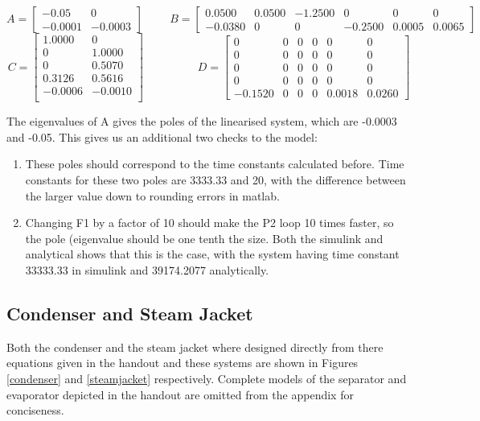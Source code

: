 \documentclass[11pt]{article}
\begin{document}
\[
A = 
\begin{bmatrix}
-0.05 & 0 \\
-0.0001 & -0.0003
\end{bmatrix}
\hspace{1cm}
B = 
\begin{bmatrix}
0.0500 & 0.0500 & -1.2500 & 0 & 0 & 0\\
-0.0380 & 0 & 0 & -0.2500 & 0.0005 & 0.0065
\end{bmatrix}
\]
\[
C = 
\begin{bmatrix}
    1.0000&         0\\
         0&    1.0000\\
         0&    0.5070\\
    0.3126&    0.5616\\
   -0.0006&   -0.0010\\

\end{bmatrix}
\hspace{2cm}
D = 
\begin{bmatrix}
0&         0&         0&         0&         0&         0\\
0&         0&         0&         0&         0&         0\\
0&         0&         0&         0&         0&         0\\
0&         0&         0&         0&         0&         0\\
-0.1520 &        0&         0&         0&    0.0018&    0.0260

\end{bmatrix}
\]

The eigenvalues of A gives the poles of the linearised system, which are -0.0003 and -0.05. This gives us an additional two checks to the model: 
\begin{enumerate}
\item These poles should correspond to the time constants calculated before. Time constants for these two poles are 3333.33 and 20, with the difference between the larger value down to rounding errors in matlab.
\item Changing F1 by a factor of 10 should make the P2 loop 10 times faster, so the pole (eigenvalue should be one tenth the size. Both the simulink and analytical shows that this is the case, with the system having time constant 33333.33 in simulink and 39174.2077 analytically.
\end{enumerate}

\subsection{Condenser and Steam Jacket}
Both the condenser and the steam jacket where designed directly from there equations given in the handout and these systems are shown in Figures \ref{condenser} and \ref{steamjacket} respectively. Complete models of the separator and evaporator depicted in the handout are omitted from the appendix for conciseness.
\end{document}
